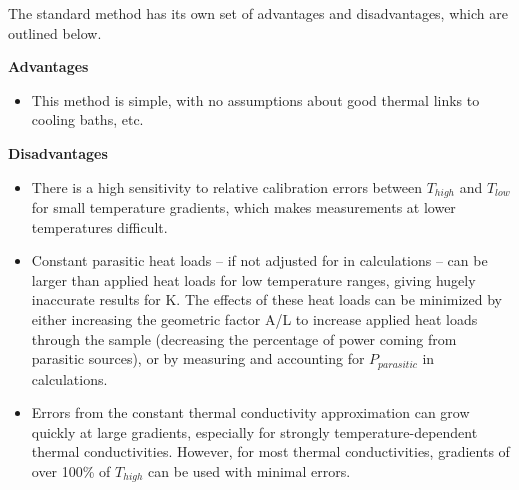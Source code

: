 \documentclass{report}
\begin{document}
The standard method has its own set of advantages and disadvantages, which are outlined below.

\bigskip

\textbf{Advantages}
\begin{itemize}
\item This method is simple, with no assumptions about good thermal links to cooling baths, etc.
\end{itemize}

\textbf{Disadvantages}
\begin{itemize}
\item There is a high sensitivity to relative calibration errors between $T_{high}$ and $T_{low}$ for small temperature gradients, which makes measurements at lower temperatures difficult.
\item Constant parasitic heat loads -- if not adjusted for in calculations -- can be larger than applied heat loads for low temperature ranges, giving hugely inaccurate results for K. The effects of these heat loads can be minimized by either increasing the geometric factor A/L to increase applied heat loads through the sample (decreasing the percentage of power coming from parasitic sources), or by measuring and accounting for $P_{parasitic}$ in calculations.
\item Errors from the constant thermal conductivity approximation can grow quickly at large gradients, especially for strongly temperature-dependent thermal conductivities. However, for most thermal conductivities, gradients of over 100\% of $T_{high}$ can be used with minimal errors\footnotemark.
\end{itemize}

\end{document}
